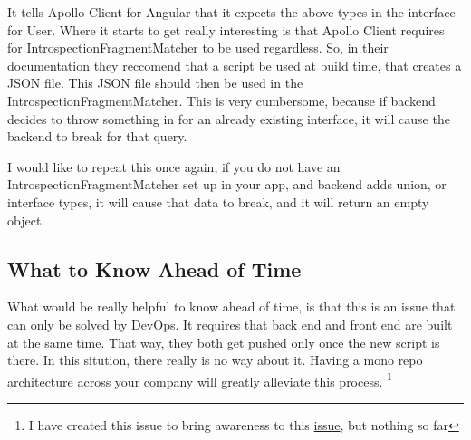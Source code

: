 It tells Apollo Client for Angular that it expects the above types in the
interface for User. Where it starts to get really interesting is that Apollo
Client requires for IntrospectionFragmentMatcher to be used regardless. So, in
their documentation they reccomend that a script be used at build time, that
creates a JSON file. This JSON file should then be used in the
IntrospectionFragmentMatcher. This is very cumbersome, because if backend
decides to throw something in for an already existing interface, it will cause
the backend to break for that query.

I would like to repeat this once again, if you do not have an
IntrospectionFragmentMatcher set up in your app, and backend adds union, or
interface types, it will cause that data to break, and it will return an empty
object.


\subsection{ What to Know Ahead of Time }
What would be really helpful to know ahead of time, is that this is an issue
that can only be solved by DevOps. It requires that back end and front end are
built at the same time. That way, they both get pushed only once the new script
is there. In this sitution, there really is no way about it. Having a mono repo
architecture across your company will greatly alleviate this process.
\footnote{I have created this issue to bring awareness to this \href{https://github.com/apollographql/apollo-client/issues/4202}{issue}, but nothing so far}
